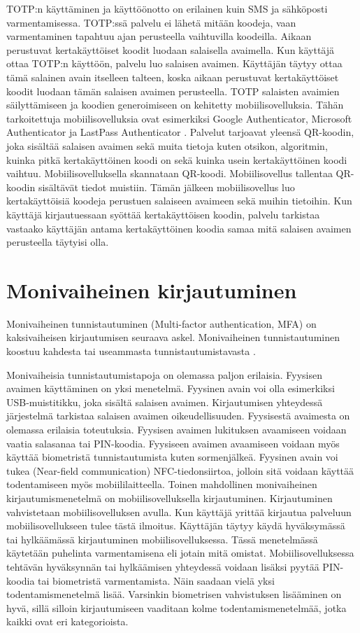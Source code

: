 TOTP:n käyttäminen ja käyttöönotto on erilainen kuin SMS ja sähköposti varmentamisessa. TOTP:ssä palvelu ei lähetä mitään koodeja, vaan varmentaminen tapahtuu ajan perusteella vaihtuvilla koodeilla. Aikaan perustuvat kertakäyttöiset koodit luodaan salaisella avaimella. Kun käyttäjä ottaa TOTP:n käyttöön, palvelu luo salaisen avaimen. Käyttäjän täytyy ottaa tämä salainen avain itselleen talteen, koska aikaan perustuvat kertakäyttöiset koodit luodaan tämän salaisen avaimen perusteella. TOTP salaisten avaimien säilyttämiseen ja koodien generoimiseen on kehitetty mobiilisovelluksia. Tähän tarkoitettuja mobiilisovelluksia ovat esimerkiksi Google Authenticator, Microsoft Authenticator ja LastPass Authenticator \citep{best_authenticator_apps}. Palvelut tarjoavat yleensä QR-koodin, joka sisältää salaisen avaimen sekä muita tietoja kuten otsikon, algoritmin, kuinka pitkä kertakäyttöinen koodi on sekä kuinka usein kertakäyttöinen koodi vaihtuu. Mobiilisovelluksella skannataan QR-koodi. Mobiilisovellus tallentaa QR-koodin sisältävät tiedot muistiin. Tämän jälkeen mobiilisovellus luo kertakäyttöisiä koodeja perustuen salaiseen avaimeen sekä muihin tietoihin. Kun käyttäjä kirjautuessaan syöttää kertakäyttöisen koodin, palvelu tarkistaa vastaako käyttäjän antama kertakäyttöinen koodia samaa mitä salaisen avaimen perusteella täytyisi olla.


\section{Monivaiheinen kirjautuminen}

Monivaiheinen tunnistautuminen (Multi-factor authentication, MFA) on kaksivaiheisen kirjautumisen seuraava askel. Monivaiheinen tunnistautuminen koostuu kahdesta tai useammasta tunnistautumistavasta \citep{two_factor_multi_factor_difference}.

Monivaiheisia tunnistautumistapoja on olemassa paljon erilaisia. Fyysisen avaimen käyttäminen on yksi menetelmä. Fyysinen avain voi olla esimerkiksi USB-muistitikku, joka sisältä salaisen avaimen. Kirjautumisen yhteydessä järjestelmä tarkistaa salaisen avaimen oikeudellisuuden. Fyysisestä avaimesta on olemassa erilaisia toteutuksia. Fyysisen avaimen lukituksen avaamiseen voidaan vaatia salasanaa tai PIN-koodia. Fyysiseen avaimen avaamiseen voidaan myös käyttää biometristä tunnistautumista kuten sormenjälkeä. Fyysinen avain voi tukea (Near-field communication) NFC-tiedonsiirtoa, jolloin sitä voidaan käyttää todentamiseen myös mobiililaitteella.
Toinen mahdollinen monivaiheinen kirjautumismenetelmä on mobiilisovelluksella kirjautuminen. Kirjautuminen vahvistetaan mobiilisovelluksen avulla. Kun käyttäjä yrittää kirjautua palveluun mobiilisovellukseen tulee tästä ilmoitus. Käyttäjän täytyy käydä hyväksymässä tai hylkäämässä kirjautuminen mobiilisovelluksessa. Tässä menetelmässä käytetään puhelinta varmentamisena eli jotain mitä omistat. Mobiilisovelluksessa tehtävän hyväksynnän tai hylkäämisen yhteydessä voidaan lisäksi pyytää PIN-koodia tai biometristä varmentamista. Näin saadaan vielä yksi todentamismenetelmä lisää. Varsinkin biometrisen vahvistuksen lisääminen on hyvä, sillä silloin kirjautumiseen vaaditaan kolme todentamismenetelmää, jotka kaikki ovat eri kategorioista. 

